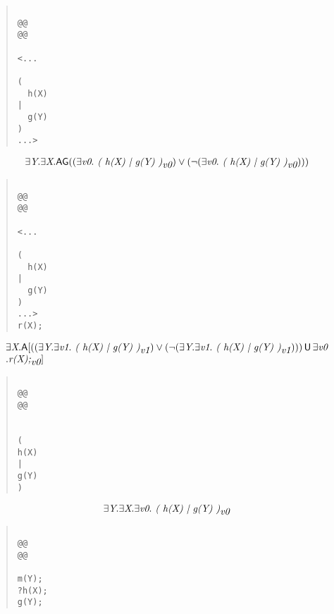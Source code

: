 \documentclass{article}
\newcommand{\U}{\,\mbox{\sf{U}}\,}
\newcommand{\A}{\mbox{\sf{A}}}
\newcommand{\AG}{\mbox{\sf{AG}}}
\newcommand{\mita}[1]{\mbox{\it{{#1}}}}
\begin{document}
\begin{quote}\begin{verbatim}

@@
@@

<...
  
(
  h(X)
|
  g(Y)
)
...>
\end{verbatim}\end{quote}

\[\begin{array}{l}
\exists \mita{Y} . \exists \mita{X} . \AG((\exists \mita{v0} . \mita{
(
h(X)
|
g(Y)
)}_{\mita{v0}}) \vee (\neg (\exists \mita{v0} . \mita{
(
h(X)
|
g(Y)
)}_{\mita{v0}})))
\end{array}\]

\begin{quote}\begin{verbatim}

@@
@@

<...
  
(
  h(X)
|
  g(Y)
)
...>
r(X);
\end{verbatim}\end{quote}

\[\begin{array}{l}
\exists \mita{X} . \A[((\exists \mita{Y} . \exists \mita{v1} . \mita{
(
h(X)
|
g(Y)
)}_{\mita{v1}}) \vee (\neg (\exists \mita{Y} . \exists \mita{v1} . \mita{
(
h(X)
|
g(Y)
)}_{\mita{v1}}))) \U \exists \mita{v0}\\\mbox{} . \mita{r(X);}_{\mita{v0}}]

\end{array}\]

\begin{quote}\begin{verbatim}

@@
@@


(
h(X)
|
g(Y)
)
\end{verbatim}\end{quote}

\[\begin{array}{l}
\exists \mita{Y} . \exists \mita{X} . \exists \mita{v0} . \mita{
(
h(X)
|
g(Y)
)}_{\mita{v0}}
\end{array}\]

\begin{quote}\begin{verbatim}

@@
@@

m(Y);
?h(X);
g(Y);
\end{verbatim}\end{quote}
\end{document}
